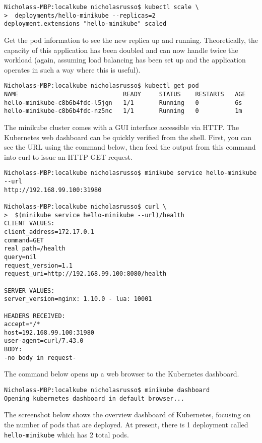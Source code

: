 \begin{verbatim}
Nicholass-MBP:localkube nicholasrusso$ kubectl scale \
>  deployments/hello-minikube --replicas=2
deployment.extensions "hello-minikube" scaled
\end{verbatim}

Get the pod information to see the new replica up and running. Theoretically,
the capacity of this application has been doubled and can now handle twice the
workload (again, assuming load balancing has been set up and the application
operates in such a way where this is useful).

\begin{verbatim}
Nicholass-MBP:localkube nicholasrusso$ kubectl get pod
NAME                             READY     STATUS    RESTARTS   AGE
hello-minikube-c8b6b4fdc-l5jgn   1/1       Running   0          6s
hello-minikube-c8b6b4fdc-nz5nc   1/1       Running   0          1m
\end{verbatim}

The minikube cluster comes with a GUI interface accessible via HTTP\@. The
Kubernetes web dashboard can be quickly verified from the shell. First, you
can see the URL using the command below, then feed the output from this
command into curl to issue an HTTP GET request.

\begin{verbatim}
Nicholass-MBP:localkube nicholasrusso$ minikube service hello-minikube --url
http://192.168.99.100:31980

Nicholass-MBP:localkube nicholasrusso$ curl \
>  $(minikube service hello-minikube --url)/health
CLIENT VALUES:
client_address=172.17.0.1
command=GET
real path=/health
query=nil
request_version=1.1
request_uri=http://192.168.99.100:8080/health

SERVER VALUES:
server_version=nginx: 1.10.0 - lua: 10001

HEADERS RECEIVED:
accept=*/*
host=192.168.99.100:31980
user-agent=curl/7.43.0
BODY:
-no body in request-
\end{verbatim}

The command below opens up a web browser to the Kubernetes dashboard.

\begin{verbatim}
Nicholass-MBP:localkube nicholasrusso$ minikube dashboard
Opening kubernetes dashboard in default browser...
\end{verbatim}

The screenshot below shows the overview dashboard of Kubernetes, focusing on
the number of pods that are deployed. At present, there is 1 deployment called
\verb|hello-minikube| which has 2 total pods.

